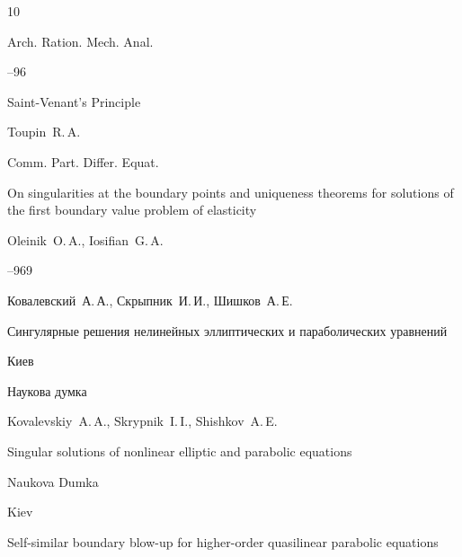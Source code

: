\begin{thebibliography}{10}

\jour Arch. Ration. Mech. Anal. 




--96


\paper Saint-Venant's Principle

\by  Toupin~R.\,A.








\jour Comm. Part. Differ. Equat.

\paper On singularities at the boundary points and uniqueness theorems for solutions of the first boundary value problem of elasticity

\by Oleinik~O.\,A., Iosifian~G.\,A.




--969 




\by  Ковалевский~А.\,А., Скрыпник~И.\,И.,  Шишков~А.\,Е. 

\book Сингулярные решения нелинейных эллиптических и параболических уравнений 



\publaddr  Киев

\publ Наукова думка

\misctransl

\by Kovalevskiy~A.\,A., Skrypnik~I.\,I., Shishkov~A.\,E.

\book Singular solutions of nonlinear elliptic and parabolic equations

\publ Naukova Dumka

\publaddr Kiev












\paper Self-similar boundary blow-up for higher-order quasilinear parabolic equations


\end{thebibliography}
